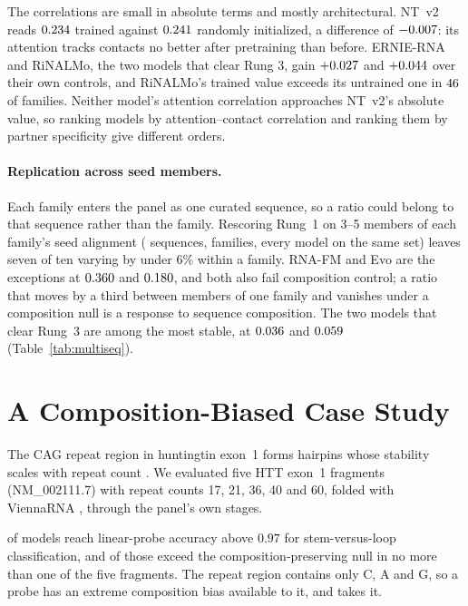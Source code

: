 \documentclass{article}
\begin{document}
The correlations are small in absolute terms and mostly architectural. NT~v2
reads $0.234{}$ trained against $0.241{}$ randomly
initialized, a difference of $-0.007{}$: its attention tracks contacts
no better after pretraining than before. ERNIE-RNA and RiNALMo, the two models
that clear Rung 3, gain $+0.027{}$ and $+0.044{}$ over
their own controls, and RiNALMo's trained value exceeds its untrained one in
$46{}$ of \panelN{} families. Neither model's attention
correlation approaches NT~v2's absolute value, so ranking models by
attention--contact correlation and ranking them by partner specificity give
different orders.

\paragraph{Replication across seed members.} Each family enters the panel as one
curated sequence, so a ratio could belong to that sequence rather than the
family. Rescoring Rung~1 on 3--5 members of each family's seed alignment
(\multiseqN{} sequences, \multiseqFamilies{} families, every model on the same
set) leaves seven of ten varying by under 6\% within a family. RNA-FM and Evo
are the exceptions at $0.360{}$ and $0.180{}$, and both also fail
composition control; a ratio that moves by a third between members of one family
and vanishes under a composition null is a response to sequence composition. The
two models that clear Rung~3 are among the most stable, at $0.036{}$ and
$0.059{}$ (Table~\ref{tab:multiseq}).

\section{A Composition-Biased Case Study}
\label{sec:htt}

The CAG repeat region in huntingtin exon~1 forms hairpins whose stability scales
with repeat count \citep{demezer2011mutant, krzyzosiak2012triplet}. We evaluated
five HTT exon~1 fragments (NM\_002111.7) with repeat counts 17, 21, 36, 40 and
60, folded with ViennaRNA \citep{lorenz2011viennarna}, through the panel's own
stages.



\httHighProbing{} of \httModels{} models reach linear-probe accuracy above
$0.97$ for stem-versus-loop classification, and \httHighProbingClean{} of those
exceed the composition-preserving null in no more than one of the five
fragments. The repeat region contains only C, A and G, so a probe has an extreme
composition bias available to it, and takes it.
\end{document}
